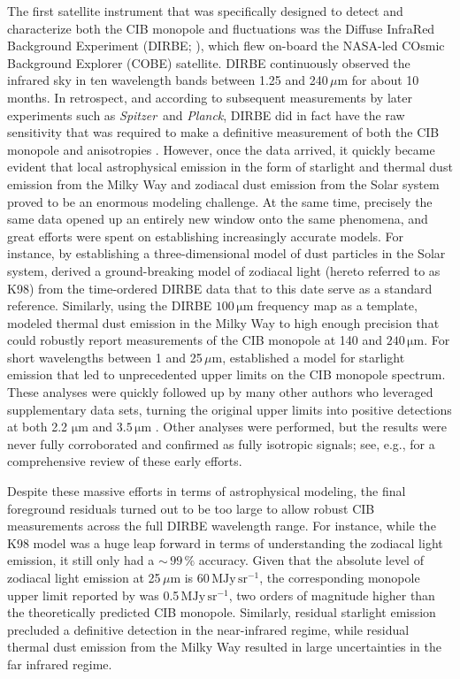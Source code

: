 \documentclass{aa}
\def\Planck{\textit{Planck}}
\def\Spitzer{\textit{Spitzer}}
\begin{document}
The first satellite instrument that was specifically designed to detect and characterize both the CIB monopole and fluctuations was the Diffuse InfraRed Background Experiment (DIRBE; \citealp{hauser1998}), which flew on-board the NASA-led COsmic Background Explorer (COBE) satellite. DIRBE continuously observed the infrared sky in ten wavelength bands between 1.25 and 240\,$\mu\mathrm{m}$ for about 10 months. In retrospect, and according to subsequent measurements by later experiments such as \Spitzer\ and \Planck, DIRBE did in fact have the raw sensitivity that was required to make a definitive measurement of both the CIB monopole and anisotropies \citep{boggess92,hauser1998}. However, once the data arrived, it quickly became evident that local astrophysical emission in the form of starlight and thermal dust emission from the Milky Way and zodiacal dust emission from the Solar system proved to be an enormous modeling challenge. At the same time, precisely the same data opened up an entirely new window onto the same phenomena, and great efforts were spent on establishing increasingly accurate models. For instance, by establishing a three-dimensional model of dust particles in the Solar system, \citet{kelsall1998} derived a ground-breaking model of zodiacal light (hereto referred to as K98) from the time-ordered DIRBE data that to this date serve as a standard reference. Similarly, using the DIRBE $100\,\mathrm{\mu m}$ frequency map as a template, \citet{arendt1998} modeled thermal dust emission in the Milky Way to high enough precision that \citet{hauser1998} could robustly report measurements of the CIB monopole at 140 and $240\,\mathrm{\mu m}$. For short wavelengths between 1 and 25$\,\mu\mathrm{m}$, \citet{arendt1998} established a model for starlight emission that led to unprecedented upper limits on the CIB monopole spectrum. These analyses were quickly followed up by many other authors who leveraged supplementary data sets, turning the original upper limits into positive detections at both 2.2 $\mathrm{\mu m}$ \citep{wright:2000,gorjian:2000,wright:2001} and $3.5\,\mathrm{\mu m}$ \citep{dwek:1998b,gorjian:2000,wright:2000}. Other analyses were performed, but the results were never fully corroborated and confirmed as fully isotropic signals; see, e.g., \citet{hauser:2001} for a comprehensive review of these early efforts.

Despite these massive efforts in terms of astrophysical modeling, the final foreground residuals turned out to be too large to allow robust CIB measurements across the full DIRBE wavelength range. For instance, while the K98 model was a huge leap forward in terms of understanding the zodiacal light emission, it still only had a $\sim$\,$99\,\%$ accuracy. Given that the absolute level of zodiacal light emission at 25$\,\mu\mathrm{m}$ is 60\,$\mathrm{MJy\,sr^{-1}}$, the corresponding monopole upper limit reported by \citet{hauser1998} was 0.5\,$\mathrm{MJy\,sr^{-1}}$, two orders of magnitude higher than the theoretically predicted CIB monopole. Similarly, residual starlight emission precluded a definitive detection in the near-infrared regime, while residual thermal dust emission from the Milky Way resulted in large uncertainties in the far infrared regime. 
\end{document}
